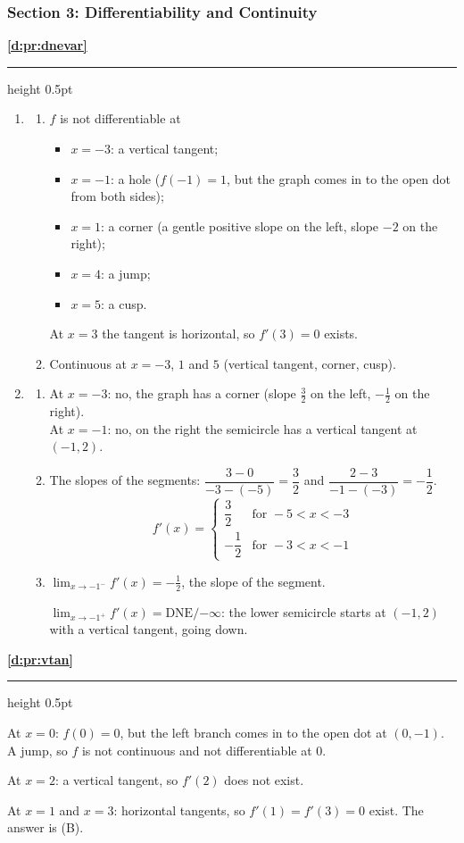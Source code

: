 \documentclass[11pt,a4paper]{article}
\newcommand{\solitem}[2]{%
 \par\addvspace{16pt}\Needspace{10\baselineskip}%
 {\large\bfseries \ref{#1}}\par\nobreak\vspace{2pt}%
 {\color{rulegray}\hrule height 0.5pt}\nobreak\vspace{7pt}%
 #2\par}
\newcommand{\DNEninf}{\ensuremath{\text{DNE}/{-\infty}}}
\begin{document}
\subsubsection*{Section 3: Differentiability and Continuity}
\solitem{d:pr:dnevar}{%
\begin{enumerate}[label=(\alph*)]
 \item
 \begin{enumerate}[label=(\roman*)]
  \item $f$ is not differentiable at
  \begin{itemize}
   \item $x=-3$: a vertical tangent;
   \item $x=-1$: a hole ($f(-1)=1$, but the graph comes in to the open dot from both sides);
   \item $x=1$: a corner (a gentle positive slope on the left, slope $-2$ on the right);
   \item $x=4$: a jump;
   \item $x=5$: a cusp.
  \end{itemize}
  At $x=3$ the tangent is horizontal, so $f'(3)=0$ exists.
  \item Continuous at $x=-3$, $1$ and $5$ (vertical tangent, corner, cusp).
 \end{enumerate}
 \item
 \begin{enumerate}[label=(\roman*)]
  \item At $x=-3$: no, the graph has a corner (slope $\frac32$ on the left, $-\frac12$ on the right).\\
  At $x=-1$: no, on the right the semicircle has a vertical tangent at $(-1,2)$.
  \item The slopes of the segments: $\dfrac{3-0}{-3-(-5)}=\dfrac32$ and $\dfrac{2-3}{-1-(-3)}=-\dfrac12$.
  \[
  f'(x)=\begin{cases}\dfrac32 & \text{for } -5<x<-3\\[6pt] -\dfrac12 & \text{for } -3<x<-1\end{cases}
  \]
  \item $\displaystyle\lim_{x\to-1^-}f'(x)=-\frac12$, the slope of the segment.

  $\displaystyle\lim_{x\to-1^+}f'(x)=\DNEninf$: the lower semicircle starts at $(-1,2)$ with a vertical tangent, going down.
 \end{enumerate}
\end{enumerate}
}

\solitem{d:pr:vtan}{%
At $x=0$: $f(0)=0$, but the left branch comes in to the open dot at $(0,-1)$. A jump, so $f$ is not continuous and not differentiable at $0$.

At $x=2$: a vertical tangent, so $f'(2)$ does not exist.

At $x=1$ and $x=3$: horizontal tangents, so $f'(1)=f'(3)=0$ exist. The answer is (B).
}
\end{document}
